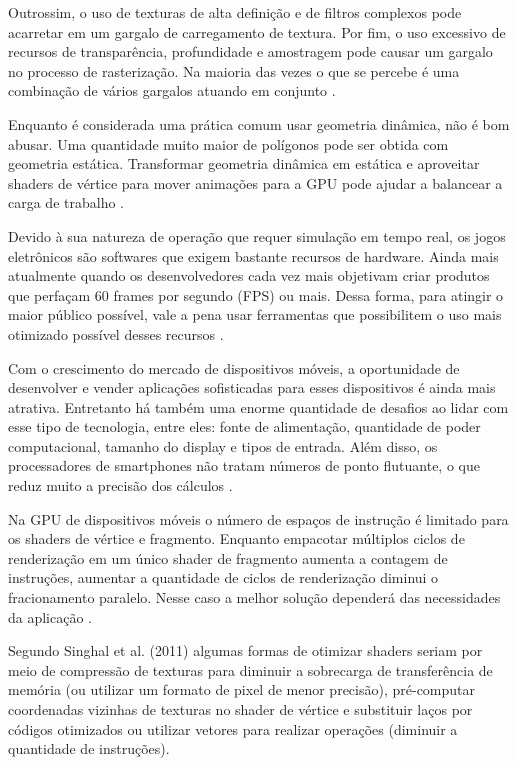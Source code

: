Outrossim, o uso de texturas de alta definição e de filtros complexos pode acarretar em um gargalo de carregamento de textura. Por fim, o uso excessivo de recursos de transparência, profundidade e amostragem pode causar um gargalo no processo de rasterização. Na maioria das vezes o que se percebe é uma combinação de vários gargalos atuando em conjunto \cite{riguer2002performance}. 

Enquanto é considerada uma prática comum usar geometria dinâmica, não é bom abusar. Uma quantidade muito maior de polígonos pode ser obtida com geometria estática. Transformar geometria dinâmica em estática e aproveitar shaders de vértice para mover animações para a GPU pode ajudar a balancear a carga de trabalho \cite{riguer2002performance}. 

Devido à sua natureza de operação que requer simulação em tempo real, os jogos eletrônicos são softwares que exigem bastante recursos de hardware. Ainda mais atualmente quando os desenvolvedores cada vez mais objetivam criar produtos que perfaçam 60 frames por segundo (FPS) ou mais. Dessa forma, para atingir o maior público possível, vale a pena usar ferramentas que possibilitem o uso mais otimizado possível desses recursos \cite{comparacaoDesempenho}.

Com o crescimento do mercado de dispositivos móveis, a oportunidade de desenvolver e vender aplicações sofisticadas para esses dispositivos é ainda mais atrativa. Entretanto há também uma enorme quantidade de desafios ao lidar com esse tipo de tecnologia, entre eles: fonte de alimentação, quantidade de poder computacional, tamanho do display e tipos de entrada. Além disso, os processadores de smartphones não tratam números de ponto flutuante, o que reduz muito a precisão dos cálculos \cite{optimizationMobile}.

Na GPU de dispositivos móveis o número de espaços de instrução é limitado para os shaders de vértice e fragmento. Enquanto empacotar múltiplos ciclos de renderização em um único shader de fragmento aumenta a contagem de instruções, aumentar a quantidade de ciclos de renderização diminui o fracionamento paralelo. Nesse caso a melhor solução dependerá das necessidades da aplicação \cite{designMobileGPU}. 

Segundo Singhal et al. (2011) algumas formas de otimizar shaders seriam por meio de compressão de texturas para diminuir a sobrecarga de transferência de memória (ou utilizar um formato de pixel de menor precisão), pré-computar coordenadas vizinhas de texturas no shader de vértice e substituir laços por códigos otimizados ou utilizar vetores para realizar operações (diminuir a quantidade de instruções).

